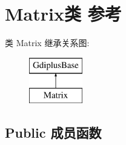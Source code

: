 \hypertarget{class_matrix}{}\section{Matrix类 参考}
\label{class_matrix}
类 Matrix 继承关系图\+:\begin{figure}[H]
\begin{center}
\leavevmode
\includegraphics[height=2.000000cm]{class_matrix}
\end{center}
\end{figure}
\subsection*{Public 成员函数}
